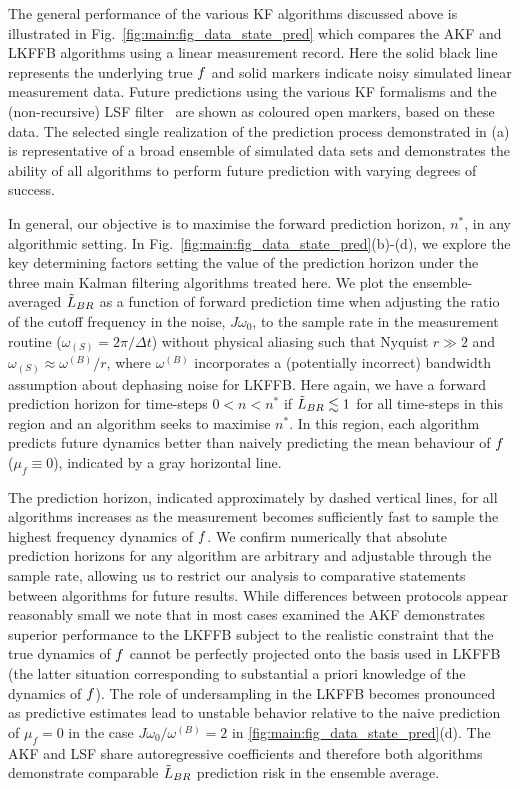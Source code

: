 The general performance of the various KF algorithms discussed above is illustrated in Fig.~\ref{fig:main:fig_data_state_pred} which compares the AKF and LKFFB algorithms using a linear measurement record.  Here the solid black line represents the underlying true $f$ and solid markers indicate noisy simulated linear measurement data.  Future predictions using the various KF formalisms and the (non-recursive) LSF filter~\cite{mavadia2017} are shown as coloured open markers, based on these data.  The selected single realization of the prediction process demonstrated in (a) is representative of a broad ensemble of simulated data sets and demonstrates the ability of all algorithms to perform future prediction with varying degrees of success.  


In general, our objective is to maximise the forward prediction horizon, $n^{*}$, in any algorithmic setting.  In Fig.~\ref{fig:main:fig_data_state_pred}(b)-(d), we explore the key determining factors setting the value of the prediction horizon under the three main Kalman filtering algorithms treated here.  We plot the ensemble-averaged $\tilde{L}_{BR}$ as a function of forward prediction time when adjusting the ratio of the cutoff frequency in the noise, $J\omega_{0}$, to the sample rate in the measurement routine ($\omega_{(S)}=2\pi/\Delta t$) without physical aliasing such that Nyquist $r \gg2$ and $\omega_{(S)} \approx \omega^{(B)} / r$, where $\omega^{(B)}$ incorporates a (potentially incorrect) bandwidth assumption about dephasing noise for LKFFB. Here again, we have a forward prediction horizon for time-steps $0 < n < n^*$ if $\tilde{L}_{BR}\lesssim 1$ for all time-steps in this region and an algorithm seeks to maximise $n^*$. In this region, each algorithm predicts future dynamics better than naively predicting the mean behaviour of $f$ ($\mu_f \equiv 0$), indicated by a gray horizontal line.

The prediction horizon, indicated approximately by dashed vertical lines, for all algorithms increases as the measurement becomes sufficiently fast to sample the highest frequency dynamics of $f$.  We confirm numerically that absolute prediction horizons for any algorithm are arbitrary and adjustable through the sample rate, allowing us to restrict our analysis to comparative statements between algorithms for future results.  While differences between protocols appear reasonably small we note that in most cases examined the AKF demonstrates superior performance to the LKFFB subject to the realistic constraint that the true dynamics of $f$ cannot be perfectly projected onto the basis used in LKFFB (the latter situation corresponding to substantial a priori knowledge of the dynamics of $f$).  The role of undersampling in the LKFFB becomes pronounced as predictive estimates lead to unstable behavior relative to the naive prediction of $\mu_f = 0$ in the case $J\omega_{0}/\omega^{(B)}=2$ in \cref{fig:main:fig_data_state_pred}(d).  The AKF and LSF share autoregressive coefficients and therefore both algorithms demonstrate comparable $\tilde{L}_{BR}$ prediction risk in the ensemble average.

